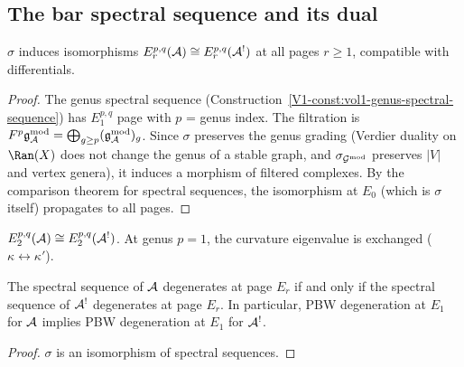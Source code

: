%
%

\subsection{The bar spectral sequence and its dual}

\begin{proposition}
$\sigma$ induces isomorphisms
$E_r^{p,q}(\mathcal{A}) \cong E_r^{p,q}(\mathcal{A}^!)$ at all pages $r \geq 1$,
compatible with differentials.
\end{proposition}

\begin{proof}
The genus spectral sequence (Construction~\ref{V1-const:vol1-genus-spectral-sequence})
has $E_1^{p,q}$ page with $p$ = genus index. The filtration is
$F^p \mathfrak{g}_{\mathcal{A}}^{\mathrm{mod}} = \bigoplus_{g \geq p}(\mathfrak{g}_{\mathcal{A}}^{\mathrm{mod}})_g$. Since
$\sigma$ preserves the genus grading (Verdier duality on $\Ran(X)$ does not
change the genus of a stable graph, and $\sigma_{\mathcal{G}^{\mathrm{mod}}}$ preserves
$|V|$ and vertex genera), it induces a morphism of filtered complexes.
By the comparison theorem for spectral sequences, the isomorphism at
$E_0$ (which is $\sigma$ itself) propagates to all pages.
\end{proof}

\begin{corollary}
$E_2^{p,q}(\mathcal{A}) \cong E_2^{p,q}(\mathcal{A}^!)$.
At genus $p = 1$, the curvature eigenvalue is exchanged
($\kappa \leftrightarrow \kappa'$).
\end{corollary}

\begin{corollary}
The spectral sequence of $\mathcal{A}$ degenerates at page $E_r$ if and only
if the spectral sequence of $\mathcal{A}^!$ degenerates at page $E_r$.
In particular, PBW degeneration at $E_1$ for $\mathcal{A}$ implies PBW
degeneration at $E_1$ for $\mathcal{A}^!$.
\end{corollary}

\begin{proof}
$\sigma$ is an isomorphism of spectral sequences.
\end{proof}

